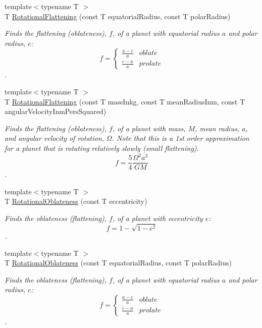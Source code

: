 \begin{DoxyCompactItemize}
{\footnotesize template$<$typename T $>$ }\\T \mbox{\hyperlink{group___e_g_x_phys-_astrophysics-_rotational_flattening_ga1840fed2081c35f68c4b8bfa75248977}{Rotational\+Flattening}} (const T equatorial\+Radius, const T polar\+Radius)
\begin{DoxyCompactList}\small\item\em Finds the flattening (oblateness), $f$, of a planet with equatorial radius $a$ and polar radius, $c$\+: \[ f =\begin{cases} \frac{a-c}{a}{} & oblate \\ \frac{c-a}{a} & prolate \end{cases} \]. \end{DoxyCompactList}\item 
{\footnotesize template$<$typename T $>$ }\\T \mbox{\hyperlink{group___e_g_x_phys-_astrophysics-_rotational_flattening_ga316b9afb6e1aa940fa96417c6f24ed4d}{Rotational\+Flattening}} (const T mass\+Inkg, const T mean\+Radius\+Inm, const T angular\+Velocity\+Inm\+Pers\+Squared)
\begin{DoxyCompactList}\small\item\em Finds the flattening (oblateness), $f$, of a planet with mass, $M$, mean radius, $a$, and angular velocity of rotation, $\Omega$. Note that this is a 1st order approximation for a planet that is rotating relatively slowly (small flattening). \[ f = \frac{5}{4} \frac{\Omega^2 a^3}{GM} \]. \end{DoxyCompactList}\item 
{\footnotesize template$<$typename T $>$ }\\T \mbox{\hyperlink{group___e_g_x_phys-_astrophysics-_rotational_flattening_ga494ad3b296185bf65ccf3e2ddebc189a}{Rotational\+Oblateness}} (const T eccentricity)
\begin{DoxyCompactList}\small\item\em Finds the oblateness (flattening), $f$, of a planet with eccentricity $e$\+: \[ f = 1 - \sqrt{1-e^2} \]. \end{DoxyCompactList}\item 
{\footnotesize template$<$typename T $>$ }\\T \mbox{\hyperlink{group___e_g_x_phys-_astrophysics-_rotational_flattening_ga0bbe606845430e58be5ed34541835f83}{Rotational\+Oblateness}} (const T equatorial\+Radius, const T polar\+Radius)
\begin{DoxyCompactList}\small\item\em Finds the oblateness (flattening), $f$, of a planet with equatorial radius $a$ and polar radius, $c$\+: \[ f =\begin{cases} \frac{a-c}{a}{} & oblate \\ \frac{c-a}{a} & prolate \end{cases} \]. \end{DoxyCompactList}\item 

\end{DoxyCompactItemize}
